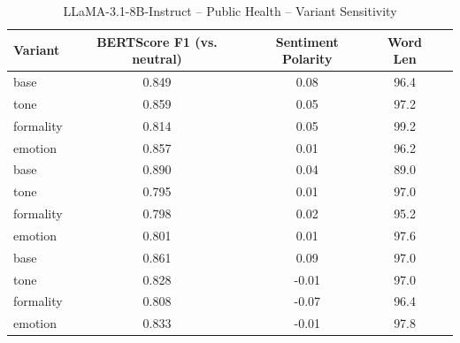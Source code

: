 \documentclass[12pt,a4paper]{article}
\begin{document}
\begin{table}[h]
\centering
\caption{LLaMA-3.1-8B-Instruct – Public Health – Variant Sensitivity}
\label{tab:LLaMA-31-8B-Instruct_Public_Health}
\begin{tabular}{lccc p{6cm}}
\toprule
Variant & BERTScore F1 (vs. neutral) & Sentiment Polarity & Word Len \\
\midrule
base & 0.849 & 0.08 & 96.4 \\
tone & 0.859 & 0.05 & 97.2 \\
formality & 0.814 & 0.05 & 99.2 \\
emotion & 0.857 & 0.01 & 96.2 \\
base & 0.890 & 0.04 & 89.0 \\
tone & 0.795 & 0.01 & 97.0 \\
formality & 0.798 & 0.02 & 95.2 \\
emotion & 0.801 & 0.01 & 97.6 \\
base & 0.861 & 0.09 & 97.0 \\
tone & 0.828 & -0.01 & 97.0 \\
formality & 0.808 & -0.07 & 96.4 \\
emotion & 0.833 & -0.01 & 97.8 \\
\bottomrule
\end{tabular}
\end{table}
\end{document}
